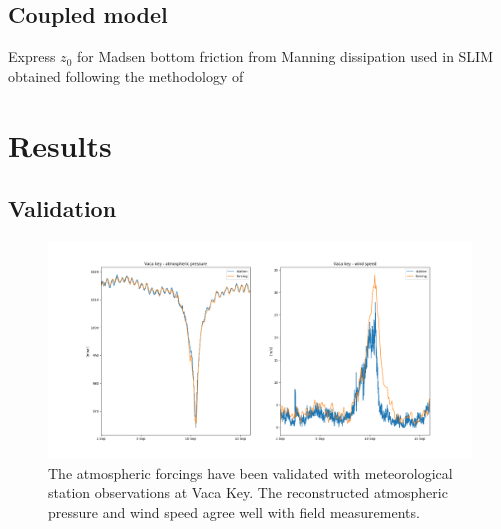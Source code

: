 \documentclass[11pt,a4paper]{article}
\begin{document}
\subsection{Coupled model}
Express $z_0$ for Madsen bottom friction from Manning dissipation used in SLIM obtained following the methodology of \cite{dietrich2011hurricane}

\section{Results}

\subsection{Validation}
\begin{figure}
    \centering
    \includegraphics[width=.95\textwidth]{fig/validation_met.png}
    \caption{The atmospheric forcings have been validated with meteorological station observations at Vaca Key. The reconstructed atmospheric pressure and wind speed agree well with field measurements.}
    \label{fig:forcings}
\end{figure}
\end{document}
